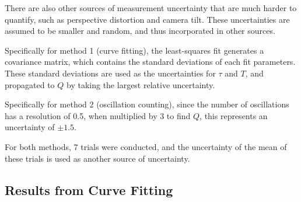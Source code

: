 \documentclass[aps,twocolumn,secnumarabic,nobalancelastpage,amsmath,amssymb,nofootinbib,floatfix,letterpaper]{revtex4}
\begin{document}
There are also other sources of measurement uncertainty that are much harder to quantify, such as perspective
distortion and camera tilt. These uncertainties are assumed to be smaller and random, and thus incorporated in other
sources.

Specifically for method 1 (curve fitting), the least-squares fit generates a covariance matrix, which contains the
standard deviations of each fit parameters. These standard deviations are used as the uncertainties for \(\tau\) and
\(T\), and propagated to \(Q\) by taking the largest relative uncertainty.

Specifically for method 2 (oscillation counting), since the number of oscillations has a resolution of 0.5, when
multiplied by 3 to find \(Q\), this represents an uncertainty of \(\pm 1.5\).

For both methods, 7 trials were conducted, and the uncertainty of the mean of these trials is used as another source of
uncertainty.

\subsection{Results from Curve Fitting}
\end{document}
